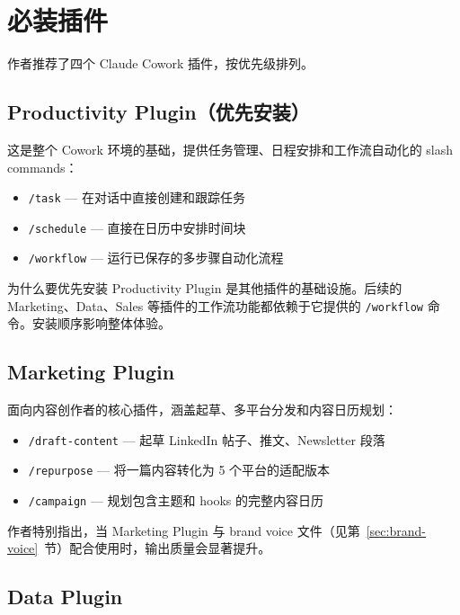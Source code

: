 \section{必装插件}

作者推荐了四个 Claude Cowork 插件，按优先级排列。

\subsection{Productivity Plugin（优先安装）}

这是整个 Cowork 环境的基础，提供任务管理、日程安排和工作流自动化的 slash commands：

\begin{itemize}
    \item \texttt{/task} --- 在对话中直接创建和跟踪任务
    \item \texttt{/schedule} --- 直接在日历中安排时间块
    \item \texttt{/workflow} --- 运行已保存的多步骤自动化流程
\end{itemize}

\begin{knowledgebox}{为什么要优先安装}
Productivity Plugin 是其他插件的基础设施。后续的 Marketing、Data、Sales 等插件的工作流功能都依赖于它提供的 \texttt{/workflow} 命令。安装顺序影响整体体验。
\end{knowledgebox}

\subsection{Marketing Plugin}

面向内容创作者的核心插件，涵盖起草、多平台分发和内容日历规划：

\begin{itemize}
    \item \texttt{/draft-content} --- 起草 LinkedIn 帖子、推文、Newsletter 段落
    \item \texttt{/repurpose} --- 将一篇内容转化为 5 个平台的适配版本
    \item \texttt{/campaign} --- 规划包含主题和 hooks 的完整内容日历
\end{itemize}

作者特别指出，当 Marketing Plugin 与 brand voice 文件（见第~\ref{sec:brand-voice}~节）配合使用时，输出质量会显著提升。

\subsection{Data Plugin}

